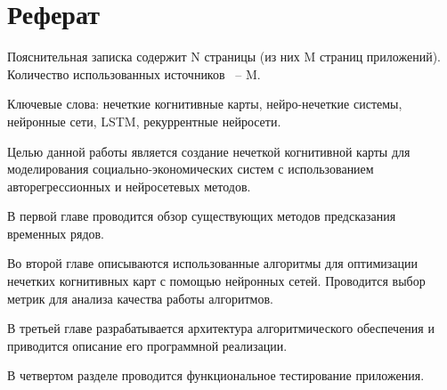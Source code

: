 \chapter*{Реферат}
\thispagestyle{plain}

Пояснительная записка содержит N страницы (из них M страниц приложений). Количество использованных источников ~-- M.

Ключевые слова: нечеткие когнитивные карты, нейро-нечеткие системы, нейронные сети, LSTM, рекуррентные нейросети.

Целью данной работы является создание нечеткой когнитивной карты для моделирования
социально-экономических систем с использованием авторегрессионных и нейросетевых методов.

В первой главе проводится обзор существующих методов предсказания временных рядов.

Во второй главе описываются использованные алгоритмы для оптимизации нечетких
когнитивных карт с помощью нейронных сетей.
Проводится выбор метрик для анализа качества работы алгоритмов.

В третьей главе разрабатывается архитектура алгоритмического обеспечения
и приводится описание его программной реализации.

В четвертом разделе проводится функциональное тестирование приложения.
